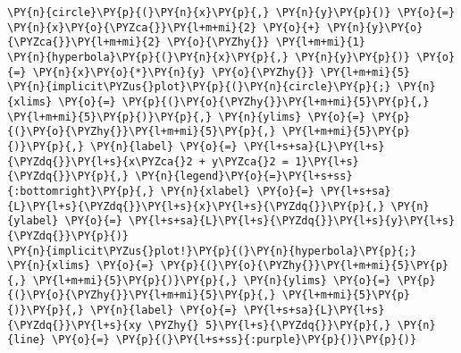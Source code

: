    \begin{tcolorbox}[breakable, size=fbox, boxrule=1pt, pad at break*=1mm,colback=cellbackground, colframe=cellborder]
\begin{Verbatim}[commandchars=\\\{\}]
\PY{n}{circle}\PY{p}{(}\PY{n}{x}\PY{p}{,} \PY{n}{y}\PY{p}{)} \PY{o}{=} \PY{n}{x}\PY{o}{\PYZca{}}\PY{l+m+mi}{2} \PY{o}{+} \PY{n}{y}\PY{o}{\PYZca{}}\PY{l+m+mi}{2} \PY{o}{\PYZhy{}} \PY{l+m+mi}{1}
\PY{n}{hyperbola}\PY{p}{(}\PY{n}{x}\PY{p}{,} \PY{n}{y}\PY{p}{)} \PY{o}{=} \PY{n}{x}\PY{o}{*}\PY{n}{y} \PY{o}{\PYZhy{}} \PY{l+m+mi}{5}
\PY{n}{implicit\PYZus{}plot}\PY{p}{(}\PY{n}{circle}\PY{p}{;} \PY{n}{xlims} \PY{o}{=} \PY{p}{(}\PY{o}{\PYZhy{}}\PY{l+m+mi}{5}\PY{p}{,} \PY{l+m+mi}{5}\PY{p}{)}\PY{p}{,} \PY{n}{ylims} \PY{o}{=} \PY{p}{(}\PY{o}{\PYZhy{}}\PY{l+m+mi}{5}\PY{p}{,} \PY{l+m+mi}{5}\PY{p}{)}\PY{p}{,} \PY{n}{label} \PY{o}{=} \PY{l+s+sa}{L}\PY{l+s}{\PYZdq{}}\PY{l+s}{x\PYZca{}2 + y\PYZca{}2 = 1}\PY{l+s}{\PYZdq{}}\PY{p}{,} \PY{n}{legend}\PY{o}{=}\PY{l+s+ss}{:bottomright}\PY{p}{,} \PY{n}{xlabel} \PY{o}{=} \PY{l+s+sa}{L}\PY{l+s}{\PYZdq{}}\PY{l+s}{x}\PY{l+s}{\PYZdq{}}\PY{p}{,} \PY{n}{ylabel} \PY{o}{=} \PY{l+s+sa}{L}\PY{l+s}{\PYZdq{}}\PY{l+s}{y}\PY{l+s}{\PYZdq{}}\PY{p}{)}
\PY{n}{implicit\PYZus{}plot!}\PY{p}{(}\PY{n}{hyperbola}\PY{p}{;} \PY{n}{xlims} \PY{o}{=} \PY{p}{(}\PY{o}{\PYZhy{}}\PY{l+m+mi}{5}\PY{p}{,} \PY{l+m+mi}{5}\PY{p}{)}\PY{p}{,} \PY{n}{ylims} \PY{o}{=} \PY{p}{(}\PY{o}{\PYZhy{}}\PY{l+m+mi}{5}\PY{p}{,} \PY{l+m+mi}{5}\PY{p}{)}\PY{p}{,} \PY{n}{label} \PY{o}{=} \PY{l+s+sa}{L}\PY{l+s}{\PYZdq{}}\PY{l+s}{xy \PYZhy{} 5}\PY{l+s}{\PYZdq{}}\PY{p}{,} \PY{n}{line} \PY{o}{=} \PY{p}{(}\PY{l+s+ss}{:purple}\PY{p}{)}\PY{p}{)}
\end{Verbatim}
\end{tcolorbox}
 
            
    
    \begin{center}
    \end{center}
    { \hspace*{\fill} \\}